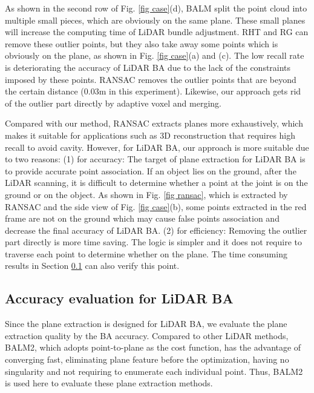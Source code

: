 \documentclass[letterpaper, 10 pt, conference]{ieeeconf}  %
\begin{document}
{As shown in the second row of Fig. \ref{fig case}(d), BALM \cite{liu2021balm} split the point cloud into multiple small pieces, which are obviously on the same plane. These small planes will increase the computing time of LiDAR bundle adjustment.} RHT and RG can remove these outlier points, but they also take away some points which is obviously on the plane, as shown in Fig. \ref{fig case}(a) and (c). The low recall rate is deteriorating the accuracy of LiDAR BA due to the lack of the constraints imposed by these points. RANSAC removes the outlier points that are beyond the certain distance (0.03m in this experiment). Likewise, our approach gets rid of the outlier part directly by adaptive voxel and merging.


Compared with our method, RANSAC extracts planes more exhaustively, which makes it suitable for applications such as 3D reconstruction that requires high recall to avoid cavity. However, for LiDAR BA, our approach is more suitable due to two reasons: (1) for accuracy: The target of plane extraction for LiDAR BA is to provide accurate point association. If an object lies on the ground, after the LiDAR scanning, it is difficult to determine whether a point at the joint is on the ground or on the object. As shown in Fig. \ref{fig ransac}, which is extracted by RANSAC and the side view of Fig. \ref{fig case}(b), some points extracted in the red frame are not on the ground which may cause false points association and decrease the final accuracy of LiDAR BA. (2) for efficiency: Removing the outlier part directly is more time saving. The logic is simpler and it does not require to traverse each point to determine whether on the plane. The time consuming results in Section \ref{experiment2} can also verify this point. 

\subsection{Accuracy evaluation for LiDAR BA} \label{experiment2}

Since the plane extraction is designed for LiDAR BA, we evaluate the plane extraction quality by the BA accuracy. Compared to other LiDAR methods, BALM2, which adopts point-to-plane as the cost function, has the advantage of converging fast, eliminating plane feature before the optimization, having no singularity and not requiring to enumerate each individual point. Thus, BALM2 is used here to evaluate these plane extraction methods. 
\end{document}
